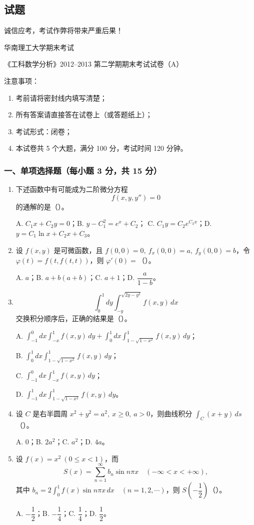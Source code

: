 \subsection{试题}
诚信应考，考试作弊将带来严重后果！

华南理工大学期末考试

《工科数学分析》2012--2013 第二学期期末考试试卷（A）

注意事项：
\begin{enumerate}
  \item 考前请将密封线内填写清楚；
  \item 所有答案请直接答在试卷上（或答题纸上）；
  \item 考试形式：闭卷；
  \item 本试卷共 5 个大题，满分 100 分，考试时间 120 分钟。
\end{enumerate}

\subsubsection*{一、单项选择题（每小题 3 分，共 15 分）}
\begin{enumerate}
  \item 下述函数中有可能成为二阶微分方程
  \[
  f(x,y,y'')=0
  \]
  的通解的是（\quad）。

  A. $C_1x+C_2y=0$；\quad B. $y-C_1^2=e^x+C_2$；\quad
  C. $C_1y=C_2e^{C_3x}$；\quad D. $y=C_1\ln x+C_2x+C_3$。

  \item 设 $f(x,y)$ 是可微函数，且 \(\displaystyle f(0,0)=0,\ f_x(0,0)=a,\ f_y(0,0)=b\)，令 $\varphi(t)=f(t,f(t,t))$，则 $\varphi'(0)=$（\quad）。

  A. $a$；\quad B. $a+b(a+b)$；\quad C. $a+1$；\quad D. $\dfrac{a}{1-b}$。

  \item
  \[
  \int_0^1dy\int_{-y}^{\sqrt{2y-y^2}} f(x,y)\,dx
  \]
  交换积分顺序后，正确的结果是（\quad）。

  A. $\displaystyle \int_{-1}^0dx\int_{-x}^1f(x,y)\,dy+\int_0^1dx\int_{1-\sqrt{1-x^2}}^1f(x,y)\,dy$；

  B. $\displaystyle \int_0^1dx\int_{1-\sqrt{1-x^2}}^1f(x,y)\,dy$；

  C. $\displaystyle \int_{-1}^0dx\int_{-x}^1f(x,y)\,dy$；

  D. $\displaystyle \int_{-1}^1dx\int_{1-\sqrt{1-x^2}}^1f(x,y)\,dy$。

  \item 设 $C$ 是右半圆周 \(\displaystyle x^2+y^2=a^2,\ x\ge0,\ a>0\)，则曲线积分 \(\displaystyle \int_C(x+y)\,ds\)（\quad）。

  A. $0$；\quad B. $2a^2$；\quad C. $a^2$；\quad D. $4a$。

  \item 设 $f(x)=x^2\ (0\le x<1)$，而
  \[
  S(x)=\sum_{n=1}^{\infty}b_n\sin n\pi x\quad(-\infty<x<+\infty),
  \]
  其中 \(\displaystyle b_n=2\int_0^1f(x)\sin n\pi x\,dx\quad(n=1,2,\cdots)\)，则 $S\!\left(-\dfrac12\right)$（\quad）。

  A. $-\dfrac12$；\quad B. $-\dfrac14$；\quad C. $\dfrac14$；\quad D. $\dfrac12$。
\end{enumerate}

